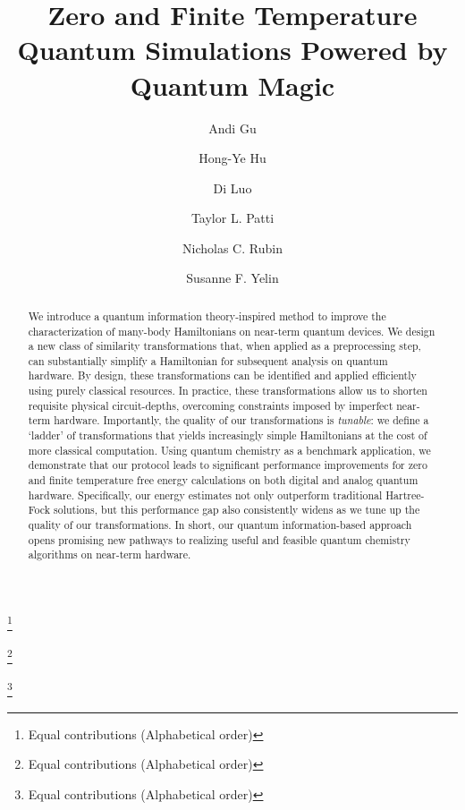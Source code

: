 \documentclass[a4paper,accepted=2024-07-10]{quantumarticle}
\begin{document}
\title{Zero and Finite Temperature Quantum Simulations Powered by Quantum Magic}
\author{Andi Gu}
\thanks{Equal contributions (Alphabetical order)}

\author{Hong-Ye Hu}
\thanks{Equal contributions (Alphabetical order)}

\author{Di Luo}
\thanks{Equal contributions (Alphabetical order)}
\author{Taylor L. Patti}
\author{Nicholas C. Rubin}
\author{Susanne F. Yelin}

\begin{abstract}
We introduce a quantum information theory-inspired method to improve the characterization of many-body Hamiltonians on near-term quantum devices. We design a new class of similarity transformations that, when applied as a preprocessing step, can substantially simplify a Hamiltonian for subsequent analysis on quantum hardware. By design, these transformations can be identified and applied efficiently using purely classical resources. In practice, these transformations allow us to shorten requisite physical circuit-depths, overcoming constraints imposed by imperfect near-term hardware. Importantly, the quality of our transformations is \emph{tunable}: we define a `ladder' of transformations that yields increasingly simple Hamiltonians at the cost of more classical computation. Using quantum chemistry as a benchmark application, we demonstrate that our protocol leads to significant performance improvements for zero and finite temperature free energy calculations on both digital and analog quantum hardware. Specifically, our energy estimates not only outperform traditional Hartree-Fock solutions, but this performance gap also consistently widens as we tune up the quality of our transformations. In short, our quantum information-based approach opens promising new pathways to realizing useful and feasible quantum chemistry algorithms on near-term hardware.
\end{abstract}
	
\end{document}
